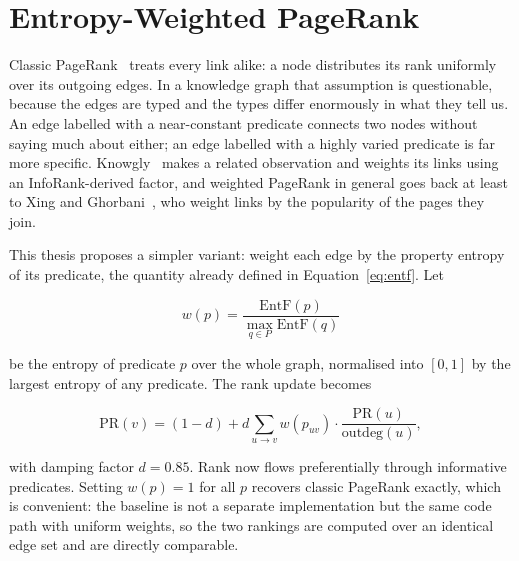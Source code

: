 \section{Entropy-Weighted PageRank}
\label{sec:entropy_weighted_pagerank}

Classic PageRank~\cite{page1999pagerank} treats every link alike: a node
distributes its rank uniformly over its outgoing edges. In a knowledge graph that
assumption is questionable, because the edges are typed and the types differ
enormously in what they tell us. An edge labelled with a near-constant predicate
connects two nodes without saying much about either; an edge labelled with a
highly varied predicate is far more specific. Knowgly~\cite{garcia2025information}
makes a related observation and weights its links using an InfoRank-derived
factor, and weighted PageRank in general goes back at least to Xing and
Ghorbani~\cite{xing2004weighted}, who weight links by the popularity of the
pages they join.

This thesis proposes a simpler variant: weight each edge by the property entropy
of its predicate, the quantity already defined in Equation~\ref{eq:entf}. Let

\begin{equation}
  w(p) = \frac{\mathrm{EntF}(p)}{\max_{q \in P} \mathrm{EntF}(q)}
  \label{eq:weight}
\end{equation}

be the entropy of predicate $p$ over the whole graph, normalised into $[0, 1]$ by
the largest entropy of any predicate. The rank update becomes

\begin{equation}
  \mathrm{PR}(v) = (1 - d) + d \sum_{u \rightarrow v}
                   w(p_{uv}) \cdot \frac{\mathrm{PR}(u)}{\mathrm{outdeg}(u)},
  \label{eq:entropy_pagerank}
\end{equation}

with damping factor $d = 0.85$. Rank now flows preferentially through
informative predicates. Setting $w(p) = 1$ for all $p$ recovers classic PageRank
exactly, which is convenient: the baseline is not a separate implementation but
the same code path with uniform weights, so the two rankings are computed over an
identical edge set and are directly comparable.

